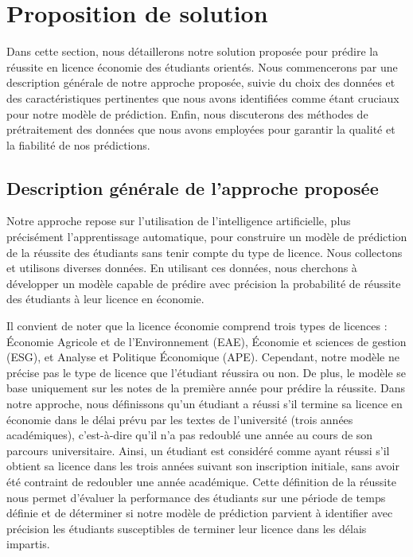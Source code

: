 \section{Proposition de solution} 
Dans cette section, nous détaillerons notre solution proposée pour prédire la réussite en licence économie des étudiants orientés. Nous commencerons par une description générale de notre approche proposée, suivie du choix des données et des caractéristiques pertinentes que nous avons identifiées comme étant cruciaux pour notre modèle de prédiction. Enfin, nous discuterons des méthodes de prétraitement des données que nous avons employées pour garantir la qualité et la fiabilité de nos prédictions.

\subsection{Description générale de l'approche proposée}
Notre approche repose sur l'utilisation de l'intelligence artificielle, plus précisément l'apprentissage automatique, pour construire un modèle de prédiction de la réussite des étudiants sans tenir compte du type de licence. Nous collectons et utilisons diverses données. En utilisant ces données, nous cherchons à développer un modèle capable de prédire avec précision la probabilité de réussite des étudiants à leur licence en économie.

Il convient de noter que la licence économie comprend trois types de licences : Économie Agricole et de l'Environnement (EAE), Économie et sciences de gestion (ESG), et Analyse et Politique Économique (APE). Cependant, notre modèle ne précise pas le type de licence que l'étudiant réussira ou non. De plus, le modèle se base uniquement sur les notes de la première année pour prédire la réussite.
Dans notre approche, nous définissons qu'un étudiant a réussi s'il termine sa licence en économie dans le délai prévu par les textes de l'université (trois années académiques), c'est-à-dire qu'il n'a pas redoublé une année au cours de son parcours universitaire. Ainsi, un étudiant est considéré comme ayant réussi s'il obtient sa licence dans les trois années suivant son inscription initiale, sans avoir été contraint de redoubler une année académique. Cette définition de la réussite nous permet d'évaluer la performance des étudiants sur une période de temps définie et de déterminer si notre modèle de prédiction parvient à identifier avec précision les étudiants susceptibles de terminer leur licence dans les délais impartis.

